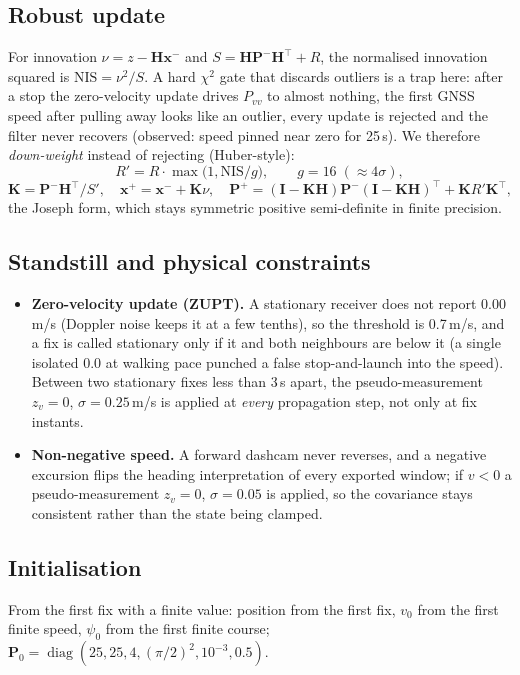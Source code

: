 \documentclass[10pt,a4paper]{article}
\newcommand{\x}{\bm{x}}
\newcommand{\Pm}{\mathbf{P}}
\newcommand{\Hm}{\mathbf{H}}
\begin{document}
\subsection{Robust update}
For innovation $\nu = z - \Hm\x^-$ and $S = \Hm\Pm^-\Hm^\top + R$, the normalised innovation squared is
$\text{NIS} = \nu^2/S$. A hard $\chi^2$ gate that discards outliers is a trap here: after a stop the
zero-velocity update drives $P_{vv}$ to almost nothing, the first GNSS speed after pulling away looks like
an outlier, every update is rejected and the filter never recovers (observed: speed pinned near zero for
25\,s). We therefore \emph{down-weight} instead of rejecting (Huber-style):
\begin{equation}
R' = R \cdot \max\!\big(1, \text{NIS}/g\big), \qquad g = 16 \;(\approx 4\sigma),
\end{equation}
\begin{equation}
\bm K = \Pm^-\Hm^\top/S', \quad \x^+ = \x^- + \bm K\nu, \quad
\Pm^+ = (\mathbf{I} - \bm K\Hm)\Pm^-(\mathbf{I} - \bm K\Hm)^\top + \bm K R'\bm K^\top,
\end{equation}
the Joseph form, which stays symmetric positive semi-definite in finite precision.

\subsection{Standstill and physical constraints}
\begin{itemize}
\item \textbf{Zero-velocity update (ZUPT).} A stationary receiver does not report 0.00\,m/s (Doppler noise
  keeps it at a few tenths), so the threshold is 0.7\,m/s, and a fix is called stationary only if it and
  both neighbours are below it (a single isolated 0.0 at walking pace punched a false stop-and-launch into
  the speed). Between two stationary fixes less than 3\,s apart, the pseudo-measurement $z_v = 0$,
  $\sigma = 0.25$\,m/s is applied at \emph{every} propagation step, not only at fix instants.
\item \textbf{Non-negative speed.} A forward dashcam never reverses, and a negative excursion flips the
  heading interpretation of every exported window; if $v < 0$ a pseudo-measurement $z_v = 0$,
  $\sigma = 0.05$ is applied, so the covariance stays consistent rather than the state being clamped.
\end{itemize}

\subsection{Initialisation}
From the first fix with a finite value: position from the first fix, $v_0$ from the first finite speed,
$\psi_0$ from the first finite course; $\Pm_0 = \operatorname{diag}(25, 25, 4, (\pi/2)^2, 10^{-3}, 0.5)$.
\end{document}
